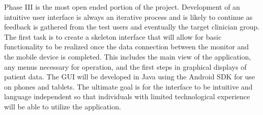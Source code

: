 \documentclass{article}
\begin{document}
Phase III is the most open ended portion of the project. Development of an intuitive user interface is always an iterative process and is likely to continue as feedback is gathered from the test users and eventually the target clinician group. The first task is to create a skeleton interface that will allow for basic functionality to be realized once the data connection between the monitor and the mobile device is completed. This includes the main view of the application, any menus necessary for operation, and the first steps in graphical displays of patient data. The GUI will be developed in Java using the Android SDK for use on phones and tablets. The ultimate goal is for the interface to be intuitive and language independent so that individuals with limited technological experience will be able to utilize the application. \\
\end{document}
